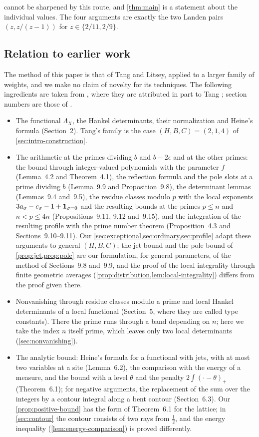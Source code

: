  cannot be sharpened by this route, and \cref{thm:main} is a statement about the individual values. The four arguments are exactly the two Landen pairs $(z,z/(z-1))$ for $z\in\{2/11,2/9\}$.

\subsection{Relation to earlier work}\label{sec:intro-sources}
The method of this paper is that of Tang and Litsey, applied to a larger family of weights, and we make no claim of novelty for its techniques. The following ingredients are taken from \cite{Litsey2026Li2}, where they are attributed in part to Tang \cite{TangLi2Half}; section numbers are those of \cite{Litsey2026Li2}.
\begin{itemize}
\item The functional $\Lambda_X$, the Hankel determinants, their normalization and Heine's formula (Section~2). Tang's family is the case $(H,B,C)=(2,1,4)$ of \cref{sec:intro-construction}.
\item The arithmetic at the primes dividing $b$ and $b-2\epsilon$ and at the other primes: the bound through integer-valued polynomials with the parameter $f$ (Lemma~4.2 and Theorem~4.1), the reflection formula and the pole slots at a prime dividing $b$ (Lemma~9.9 and Proposition~9.8), the determinant lemmas (Lemmas~9.4 and~9.5), the residue classes modulo $p$ with the local exponents $3a_\sigma-c_\sigma-1+\mathbf{1}_{\sigma=0}$ and the resulting bounds at the primes $p\le n$ and $n<p\le4n$ (Propositions~9.11, 9.12 and~9.15), and the integration of the resulting profile with the prime number theorem (Proposition~4.3 and Sections~9.10--9.11). Our \cref{sec:exceptional,sec:ordinary,sec:profile} adapt these arguments to general $(H,B,C)$; the jet bound and the pole bound of \cref{prop:jet,prop:pole} are our formulation, for general parameters, of the method of Sections~9.8 and~9.9, and the proof of the local integrality through finite geometric averages (\cref{prop:distribution,lem:local-integrality}) differs from the proof given there.
\item Nonvanishing through residue classes modulo a prime and local Hankel determinants of a local functional (Section~5, where they are called type constants). There the prime runs through a band depending on $n$; here we take the index $n$ itself prime, which leaves only two local determinants (\cref{sec:nonvanishing}).
\item The analytic bound: Heine's formula for a functional with jets, with at most two variables at a site (Lemma~6.2), the comparison with the energy of a measure, and the bound with a level $\theta$ and the penalty $2\int(\cdot-\theta)_+$ (Theorem~6.1); for negative arguments, the replacement of the sum over the integers by a contour integral along a bent contour (Section~6.3). Our \cref{prop:positive-bound} has the form of Theorem~6.1 for the lattice; in \cref{sec:contour} the contour consists of two rays from $\frac12$, and the energy inequality (\cref{lem:energy-comparison}) is proved differently.
\end{itemize}
